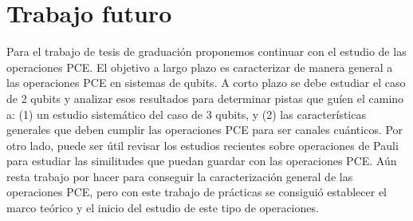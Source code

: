 % 

\section{Trabajo futuro}
Para el trabajo de tesis de graduación proponemos continuar con el
estudio de las operaciones PCE. El objetivo a largo plazo es caracterizar
de manera general a las operaciones PCE en sistemas de qubits. 
A corto plazo se debe estudiar el caso de 2 qubits y analizar esos 
resultados para determinar pistas que guíen el camino a: (1) un
estudio sistemático del caso de 3 qubits, y (2) las características generales
que deben cumplir las operaciones PCE para ser canales cuánticos.
Por otro lado, puede ser útil revisar los estudios recientes sobre operaciones
de Pauli para estudiar las similitudes que puedan guardar con las operaciones 
PCE. Aún resta trabajo por hacer para conseguir la caracterización general
de las operaciones PCE, pero con este trabajo de prácticas se consiguió 
establecer el marco teórico y el inicio del estudio de este tipo de operaciones.

